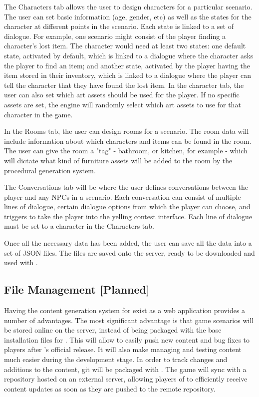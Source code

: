 \documentclass{GlobalDocument}
\begin{document}
The Characters tab allows the user to design characters for a particular scenario. The user can set basic information (age, gender, etc) as well as the states for the character at different points in the scenario. Each state is linked to a set of dialogue. For example, one scenario might consist of the player finding a character's lost item. The character would need at least two states: one default state, activated by default, which is linked to a dialogue where the character asks the player to find an item; and another state, activated by the player having the item stored in their inventory, which is linked to a dialogue where the player can tell the character that they have found the lost item. In the character tab, the user can also set which art assets should be used for the player. If no specific assets are set, the engine will randomly select which art assets to use for that character in the game.

In the Rooms tab, the user can design rooms for a scenario. The room data will include information about which characters and items can be found in the room. The user can give the room a "tag" - bathroom, or kitchen, for example - which will dictate what kind of furniture assets will be added to the room by the procedural generation system.

The Conversations tab will be where the user defines conversations between the player and any NPCs in a scenario. Each conversation can consist of multiple lines of dialogue, certain dialogue options from which the player can choose, and triggers to take the player into the yelling contest interface. Each line of dialogue must be set to a character in the Characters tab.

Once all the necessary data has been added, the user can save all the data into a set of JSON files. The files are saved onto the server, ready to be downloaded and used with \ourgame{}.



\subsection{File Management [Planned]}
Having the content generation system for \ourgame{} exist as a web application provides a number of advantages. The most significant advantage is that game scenarios will be stored online on the server, instead of being packaged with the base installation files for \ourgame{}. This will allow \ourteam{} to easily push new content and bug fixes to players after \ourgame{}'s official release. It will also make managing and testing content much easier during the development stage. In order to track changes and additions to the content, git will be packaged with \ourgame{}. The game will sync with a repository hosted on an external server, allowing players of \ourgame{} to efficiently receive content updates as soon as they are pushed to the remote repository.
\end{document}
